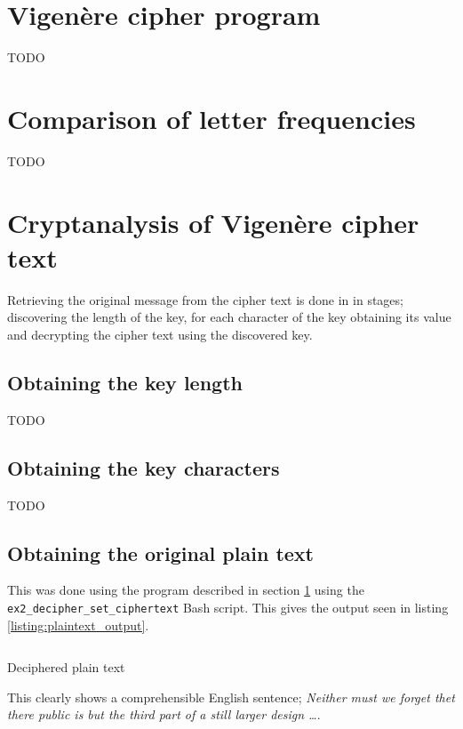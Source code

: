 \documentclass[a4paper]{article}
\title{\DOCTITLE}
\author{\DOCAUTHOR}
\date{\DOCDATE}
\newcommand{\Vigenere}{Vigen\`{e}re }
\begin{document}
\section{\Vigenere cipher program}
\label{sec:vigenere_program}

TODO

\section{Comparison of letter frequencies}

TODO

\section{Cryptanalysis of \Vigenere cipher text}

Retrieving the original message from the cipher text is done in in stages;
discovering the length of the key, for each character of the key obtaining its
value and decrypting the cipher text using the discovered key.

\subsection{Obtaining the key length}

TODO

\subsection{Obtaining the key characters}

TODO

\subsection{Obtaining the original plain text}

This was done using the program described in section \ref{sec:vigenere_program}
using the \texttt{ex2\_decipher\_set\_ciphertext} Bash script. This gives the
output seen in listing \ref{listing:plaintext_output}.

\begin{listing}
  \inputminted[frame=lines,fontsize=\scriptsize]{text}{listings/ex2_plaintext.txt}
  \caption{Deciphered plain text}
  \label{listing:plaintext_output}
\end{listing}

This clearly shows a comprehensible English sentence; \textit{Neither must we
forget thet there public is but the third part of a still larger design \ldots}.


\end{document}
